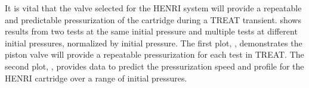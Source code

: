 It is vital that the valve selected for the HENRI system will provide a repeatable and predictable pressurization of the cartridge during a TREAT transient.  shows results from two tests at the same initial pressure and multiple tests at different initial pressures, normalized by initial pressure. The first plot, , demonstrates the piston valve will provide a repeatable pressurization for each test in TREAT. The second plot, , provides data to predict the pressurization speed and profile for the HENRI cartridge over a range of initial pressures.


